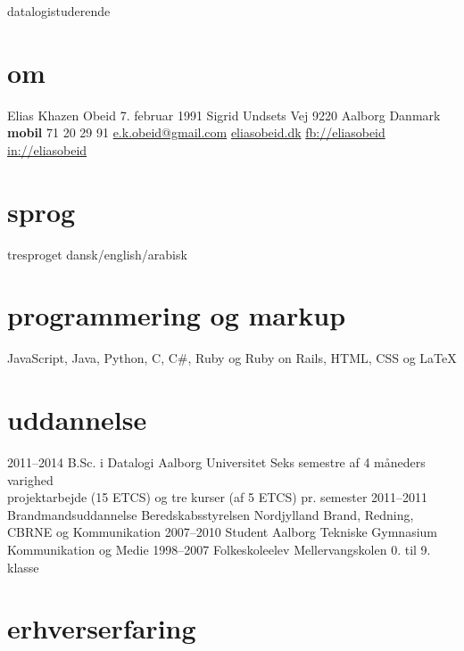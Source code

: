 \documentclass[]{friggeri-cv}
\begin{document}
       {datalogistuderende}


\begin{aside}
  \section{om}
    Elias Khazen Obeid
    7. februar 1991
    Sigrid Undsets Vej 
    9220 Aalborg
    Danmark
    ~
    \textbf{mobil} 71 20 29 91
    \href{mailto:e.k.obeid@gmail.com}{e.k.obeid@gmail.com}
    \href{http://eliasobeid.dk}{eliasobeid.dk}
    \href{http://facebook.com/eliaskhazenobeid}{fb://eliasobeid}
    \href{http://www.linkedin.com/in/eliasobeid}{in://eliasobeid}
  \section{sprog}
    tresproget dansk/english/arabisk
  \section{programmering og markup}
    JavaScript, Java,
    Python, C, C\#,
    Ruby og Ruby on Rails,
    HTML, CSS og \LaTeX{}
\end{aside}


\section{uddannelse}

\begin{entrylist}
  \entry
    {2011–2014}
    {B.Sc. {\normalfont i Datalogi}}
    {Aalborg Universitet}
    {Seks semestre af 4 måneders varighed \\
     projektarbejde (15 ETCS) og tre kurser (af 5 ETCS) pr. semester}
  \entry
    {2011–2011}
    {Brandmandsuddannelse}
    {Beredskabsstyrelsen Nordjylland}
    {Brand, Redning, CBRNE og Kommunikation}
  \entry
    {2007–2010}
    {Student}
    {Aalborg Tekniske Gymnasium}
    {Kommunikation og Medie}
  \entry
    {1998–2007}
    {Folkeskoleelev}
    {Mellervangskolen}
    {0. til 9. klasse}
\end{entrylist}

\section{erhverserfaring}
\end{document}
